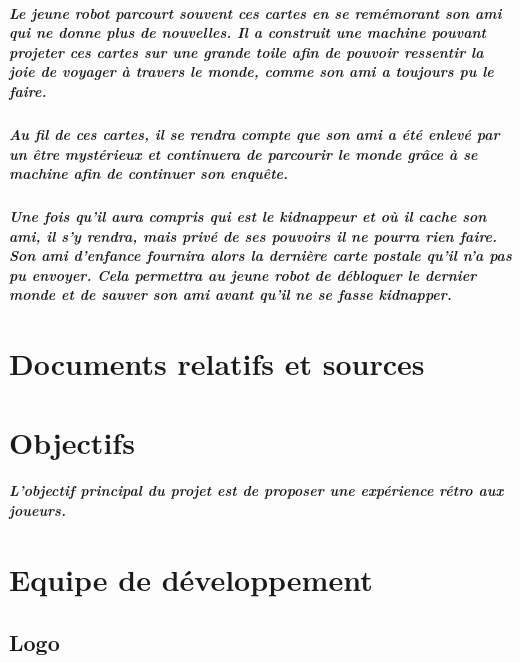 \documentclass{report}
\begin{document}
\paragraph{{\color{red}Le jeune robot} parcourt souvent ces cartes en se rem\'{e}morant son ami qui ne donne plus de nouvelles. Il a construit une machine pouvant projeter ces cartes sur une grande toile afin de pouvoir ressentir la joie de voyager à travers le monde, comme son ami a toujours pu le faire.}

\paragraph{Au fil de ces cartes, {\color{red}il} se rendra compte que son ami a \'{e}t\'{e} enlev\'{e} par un être myst\'{e}rieux et continuera de parcourir le monde grâce à se machine afin de continuer son enquête.}

\paragraph{Une fois qu’{\color{red}il} aura compris qui est le kidnappeur et où il cache son ami, il s’y rendra, mais priv\'{e} de ses pouvoirs il ne pourra rien faire. Son ami d’enfance fournira alors la derni\`{e}re carte postale qu’il n’a pas pu envoyer. Cela permettra {\color{red}au jeune robot} de d\'{e}bloquer le dernier monde et de sauver son ami avant qu’il ne se fasse kidnapper.}

		\chapter{Documents relatifs et sources}
		\chapter{Objectifs}

\paragraph{L'objectif principal du projet est de proposer une exp\'{e}rience r\'{e}tro aux joueurs.}

		\chapter{Equipe de d\'{e}veloppement}

			\section{Logo}
\end{document}

